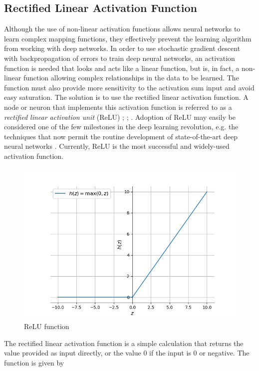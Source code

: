 \documentclass[12pt]{report}
\numberwithin{equation}{section}
\begin{document}
\subsection{Rectified Linear Activation Function}
Although the use of non-linear activation functions allows neural networks to learn complex mapping functions, they effectively prevent the learning algorithm from working with deep networks. In order to use stochastic gradient descent with backpropagation of errors to train deep neural networks, an activation function is needed that looks and acts like a linear function, but is, in fact, a non-linear function allowing complex relationships in the data to be learned. The function must also provide more sensitivity to the activation sum input and avoid easy saturation. The solution is to use the rectified linear activation function. A node or neuron that implements this activation function is referred to as a \textit{rectified linear activation unit} (ReLU) \textbf{\cite{Hahnloser}}; \textbf{\cite{Jarrett}}; \textbf{\cite{10.5555/3104322.3104425}}. Adoption of ReLU may easily be considered one of the few milestones in the deep learning revolution, e.g. the techniques that now permit the routine development of state-of-the-art deep neural networks \textbf{\cite{Krizhevsky}}. Currently, ReLU is the most successful and widely-used activation function.
\begin{figure}[htb!]
\centering 
\includegraphics[scale=0.9]{png/relu.png} 
\caption{ReLU function}
\label{fig:relu}
\end{figure}
The rectified linear activation function is a simple calculation that returns the value provided as input directly, or the value $0$ if the input is $0$ or negative. The function is given by 
\end{document}
